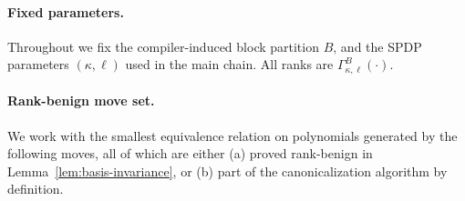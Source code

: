 \documentclass[12pt]{article}
\theoremstyle{definition}
\theoremstyle{definition}
\theoremstyle{remark}
\theoremstyle{remark}
\begin{document}
\paragraph{Fixed parameters.}
Throughout we fix the compiler-induced block partition $B$, and the SPDP parameters
$(\kappa,\ell)$ used in the main chain. All ranks are $\Gamma^{B}_{\kappa,\ell}(\cdot)$.

\paragraph{Rank-benign move set.}
We work with the smallest equivalence relation on polynomials generated by the following
moves, all of which are either (a) proved rank-benign in Lemma~\ref{lem:basis-invariance}, or (b) part of the
canonicalization algorithm by definition.
\end{document}
